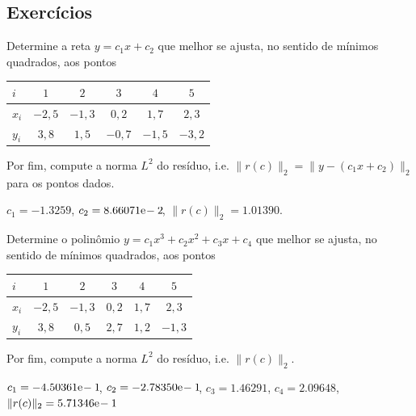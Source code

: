 \subsection*{Exercícios}

\begin{exer}
  Determine a reta $y = c_1x + c_2$ que melhor se ajusta, no sentido de mínimos quadrados, aos pontos
  \begin{center}
    \begin{tabular}{l|ccccc}
      $i$ & $1$ & $2$ & $3$ & $4$ & $5$ \\\hline
      $x_i$ & $-2,5$ & $-1,3$ & $0,2$ & $1,7$ & $2,3$\\
      $y_i$ & $3,8$ & $1,5$ & $-0,7$ & $-1,5$ & $-3,2$\\\hline
    \end{tabular}
  \end{center}
Por fim, compute a norma $L^2$ do resíduo, i.e. $\|r(c)\|_2 = \|y - (c_1x + c_2)\|_2$ para os pontos dados.
\end{exer}
\begin{resp}
  $c_1 = -1.3259$, $c_2 = 8.66071\mathrm{e}\!-2\!$, $\|r(c)\|_2 = 1.01390$.
\end{resp}

\begin{exer}
  Determine o polinômio $y = c_1x^3 + c_2x^2 + c_3x + c_4$ que melhor se ajusta, no sentido de mínimos quadrados, aos pontos
  \begin{center}
    \begin{tabular}{l|ccccc}
      $i$ & $1$ & $2$ & $3$ & $4$ & $5$ \\\hline
      $x_i$ & $-2,5$ & $-1,3$ & $0,2$ & $1,7$ & $2,3$\\
      $y_i$ & $3,8$ & $0,5$ & $2,7$ & $1,2$ & $-1,3$\\\hline
    \end{tabular}
  \end{center}
Por fim, compute a norma $L^2$ do resíduo, i.e. $\|r(c)\|_2$.
\end{exer}
\begin{resp}
  $c_1 = -4.50361\mathrm{e}\!-1\!$, $c_2 = -2.78350\mathrm{e}\!-1\!$, $c_3 = 1.46291$, $c_4 = 2.09648$, $\|r(c)\|_2 = 5.71346\mathrm{e}\!-1\!$
\end{resp}


